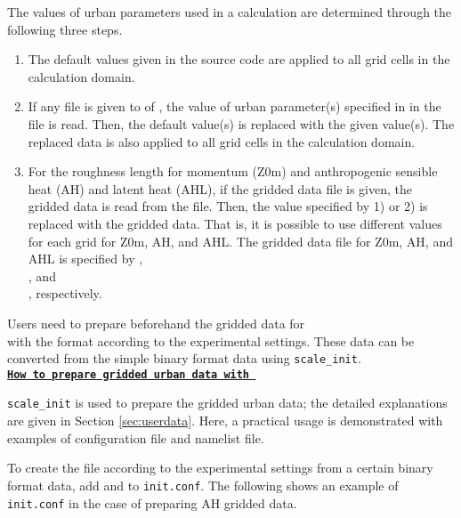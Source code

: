 The values of urban parameters used in a calculation are determined through the following three steps.
\begin{enumerate}[1)]
\item The default values given in the \scalelib source code are applied to all grid cells in the calculation domain.
\item If any file is given to  of ,
  the value of urban parameter(s) specified in  in the file is read.
  Then, the default value(s) is replaced with the given value(s).
  The replaced data is also applied to all grid cells in the calculation domain. 
\item For the roughness length for momentum (Z0m) and anthropogenic sensible heat (AH) and latent heat (AHL),
  if the gridded data file is given, the gridded data is read from the file. Then, the value specified by 1) or 2) is replaced with the gridded data.
  That is, it is possible to use different values for each grid for Z0m, AH, and AHL.
  The gridded data file for Z0m, AH, and AHL is specified by
  , \\
, and\\
, respectively.
\end{enumerate}


Users need to prepare beforehand the gridded data for \\ 
with the \scalenetcdf format according to the experimental settings.
These \scalenetcdf data can be converted from the simple binary format data using \verb|scale_init|.\\


\noindent\textbf{\underline{\small{\texttt{How to prepare gridded urban data with \scalenetcdf}}}}

\verb|scale_init| is used to prepare the gridded urban data; the detailed explanations are given in Section \ref{sec:userdata}.
Here, a practical usage is demonstrated with examples of configuration file and namelist file.

To create the \scalenetcdf file according to the experimental settings from a certain binary format data,
add  and  to \verb|init.conf|.
The following shows an example of \verb|init.conf| in the case of preparing AH gridded data.

